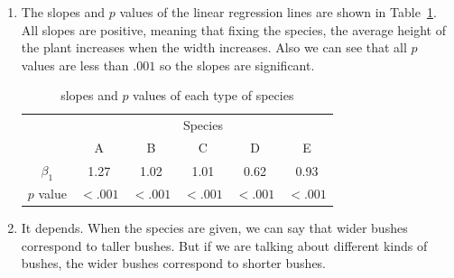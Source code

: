 \documentclass[12pt]{article}
\begin{document}
\begin{enumerate}
\item The slopes and $p$ values of the linear regression lines are shown in Table~\ref{Tab:3}. All slopes are positive, meaning that fixing the species, the average height of the plant increases when the width increases. Also we can see that all $p$ values are less than $.001$ so the slopes are significant.

\begin{table}[htpb]
	\centering
	\begin{tabular}{cccccc}
		\toprule
		\multirow{2}{*}{} &
		\multicolumn{5}{c}{Species}\\
		 & A & B & C & D & E \\
		\midrule
		$\beta_1$ &1.27&1.02&1.01&0.62&0.93\\
		\hline
		$p$ value & $<.001$ & $<.001$ & $<.001$ & $<.001$ & $<.001$ \\
		\bottomrule
	\end{tabular}
	\caption{slopes and $p$ values of each type of species}
	\label{Tab:3}
\end{table}

\item It depends. When the species are given, we can say that wider bushes correspond to taller bushes. But if we are talking about different kinds of bushes, the wider bushes correspond to shorter bushes.

\end{enumerate}
	
\end{document}
